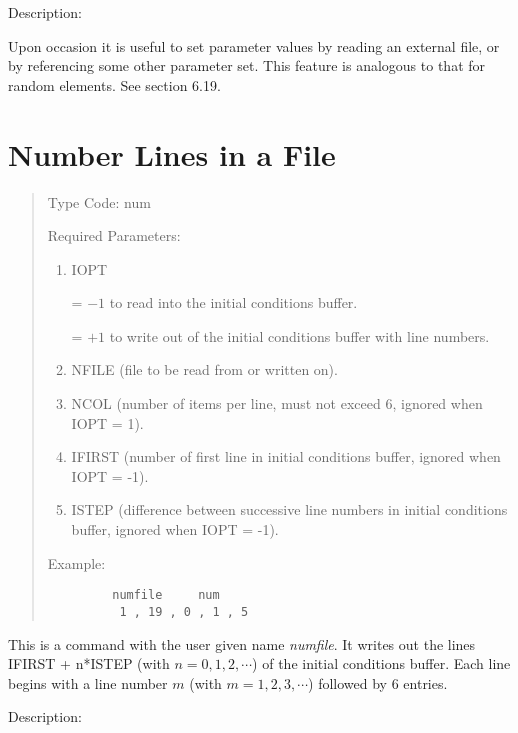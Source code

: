 \vspace{5mm}
     Description:
\vspace{2mm}

Upon occasion it is useful to set parameter values by reading an external
file, or by referencing some other parameter set.  This feature is
analogous to that for random elements.  See section 6.19.

\newpage
\section{Number Lines in a File}
\begin{quotation}
\noindent     Type Code:  num
\vspace{5mm}

\noindent Required Parameters:
\begin{enumerate}
      \item  IOPT

             = $-1$ to read into the initial conditions buffer.

             = $+1$ to write out of the initial conditions buffer with line numbers.

      \item  NFILE (file to be read from or written on).

      \item  NCOL (number of items per line, must not exceed 6, ignored when IOPT = 1).

      \item  IFIRST (number of first line in initial conditions buffer, ignored when IOPT = -1).

      \item  ISTEP (difference between successive line numbers in initial conditions buffer, ignored when IOPT = -1).
\end{enumerate}

\vspace{5mm}
\noindent Example:
\begin{verbatim}
         numfile     num
          1 , 19 , 0 , 1 , 5
\end{verbatim}
\end{quotation}

This is a command with the user given name {\em numfile}.  It writes out the lines IFIRST + n*ISTEP (with $n = 0, 1, 2, \cdots$) of the initial conditions buffer.  Each line begins with a line number $m$ (with $m = 1, 2, 3, \cdots$) followed by 6 entries.

\vspace{5mm}
     Description:
\vspace{2mm}

